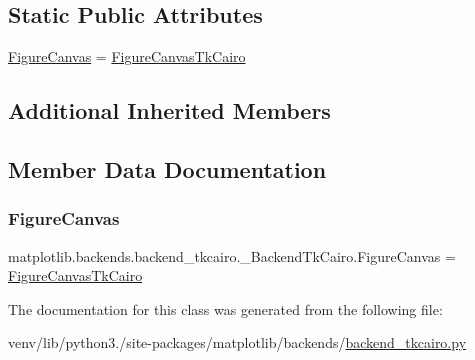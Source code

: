 \subsection*{Static Public Attributes}
\begin{DoxyCompactItemize}
\item 
\hyperlink{classmatplotlib_1_1backends_1_1backend__tkcairo_1_1__BackendTkCairo_a1464186c31718bd33809e0c1bc8587bf}{Figure\+Canvas} = \hyperlink{classmatplotlib_1_1backends_1_1backend__tkcairo_1_1FigureCanvasTkCairo}{Figure\+Canvas\+Tk\+Cairo}
\end{DoxyCompactItemize}
\subsection*{Additional Inherited Members}


\subsection{Member Data Documentation}
\mbox{\label{classmatplotlib_1_1backends_1_1backend__tkcairo_1_1__BackendTkCairo_a1464186c31718bd33809e0c1bc8587bf}} 
\subsubsection{\texorpdfstring{Figure\+Canvas}{FigureCanvas}}
{\footnotesize\ttfamily matplotlib.\+backends.\+backend\+\_\+tkcairo.\+\_\+\+Backend\+Tk\+Cairo.\+Figure\+Canvas = \hyperlink{classmatplotlib_1_1backends_1_1backend__tkcairo_1_1FigureCanvasTkCairo}{Figure\+Canvas\+Tk\+Cairo}\hspace{0.3cm}{\ttfamily [static]}}



The documentation for this class was generated from the following file\+:\begin{DoxyCompactItemize}
\item 
venv/lib/python3./site-\/packages/matplotlib/backends/\hyperlink{backend__tkcairo_8py}{backend\+\_\+tkcairo.\+py}\end{DoxyCompactItemize}

